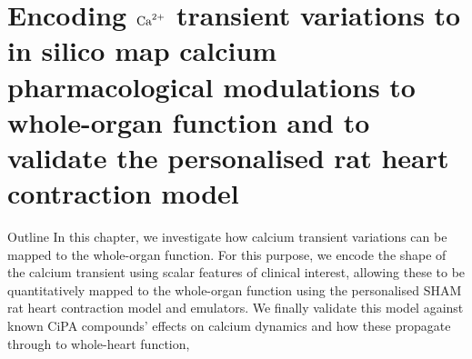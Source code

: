 \chapter{Encoding $\textrm{Ca}^{2+}$ transient variations to in silico map calcium pharmacological modulations to whole-organ function and to validate the personalised rat heart contraction model}\label{cha:chapter6}
%
%
%
\begin{remark}{Outline}
    In this chapter, we investigate how calcium transient variations can be mapped to the whole-organ function. For this purpose, we encode the shape of the calcium transient using scalar features of clinical interest, allowing these to be quantitatively mapped to the whole-organ function using the personalised SHAM rat heart contraction model and emulators. We finally validate this model against known CiPA compounds' effects on calcium dynamics and how these propagate through to whole-heart function, 
\end{remark}






